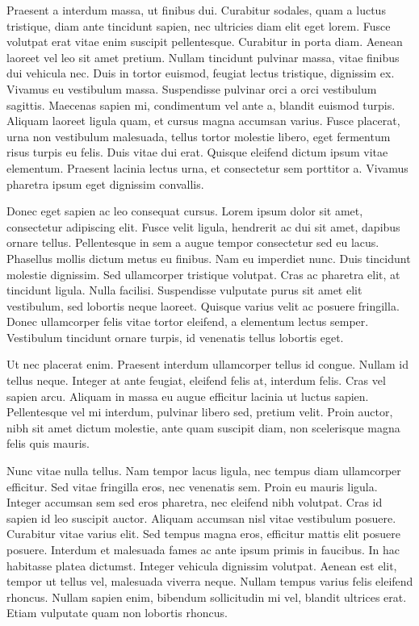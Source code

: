 \documentclass[a4paper,10pt]{article}
\theoremstyle{teorema}
\theoremstyle{plano}
\theoremstyle{titulo}
\begin{document}
Praesent a interdum massa, ut finibus dui. Curabitur sodales, quam a luctus tristique, diam ante tincidunt sapien, nec ultricies diam elit eget lorem. Fusce volutpat erat vitae enim suscipit pellentesque. Curabitur in porta diam. Aenean laoreet vel leo sit amet pretium. Nullam tincidunt pulvinar massa, vitae finibus dui vehicula nec. Duis in tortor euismod, feugiat lectus tristique, dignissim ex. Vivamus eu vestibulum massa. Suspendisse pulvinar orci a orci vestibulum sagittis. Maecenas sapien mi, condimentum vel ante a, blandit euismod turpis. Aliquam laoreet ligula quam, et cursus magna accumsan varius. Fusce placerat, urna non vestibulum malesuada, tellus tortor molestie libero, eget fermentum risus turpis eu felis. Duis vitae dui erat. Quisque eleifend dictum ipsum vitae elementum. Praesent lacinia lectus urna, et consectetur sem porttitor a. Vivamus pharetra ipsum eget dignissim convallis.

Donec eget sapien ac leo consequat cursus. Lorem ipsum dolor sit amet, consectetur adipiscing elit. Fusce velit ligula, hendrerit ac dui sit amet, dapibus ornare tellus. Pellentesque in sem a augue tempor consectetur sed eu lacus. Phasellus mollis dictum metus eu finibus. Nam eu imperdiet nunc. Duis tincidunt molestie dignissim. Sed ullamcorper tristique volutpat. Cras ac pharetra elit, at tincidunt ligula. Nulla facilisi. Suspendisse vulputate purus sit amet elit vestibulum, sed lobortis neque laoreet. Quisque varius velit ac posuere fringilla. Donec ullamcorper felis vitae tortor eleifend, a elementum lectus semper. Vestibulum tincidunt ornare turpis, id venenatis tellus lobortis eget.

Ut nec placerat enim. Praesent interdum ullamcorper tellus id congue. Nullam id tellus neque. Integer at ante feugiat, eleifend felis at, interdum felis. Cras vel sapien arcu. Aliquam in massa eu augue efficitur lacinia ut luctus sapien. Pellentesque vel mi interdum, pulvinar libero sed, pretium velit. Proin auctor, nibh sit amet dictum molestie, ante quam suscipit diam, non scelerisque magna felis quis mauris.

Nunc vitae nulla tellus. Nam tempor lacus ligula, nec tempus diam ullamcorper efficitur. Sed vitae fringilla eros, nec venenatis sem. Proin eu mauris ligula. Integer accumsan sem sed eros pharetra, nec eleifend nibh volutpat. Cras id sapien id leo suscipit auctor. Aliquam accumsan nisl vitae vestibulum posuere. Curabitur vitae varius elit. Sed tempus magna eros, efficitur mattis elit posuere posuere. Interdum et malesuada fames ac ante ipsum primis in faucibus. In hac habitasse platea dictumst. Integer vehicula dignissim volutpat. Aenean est elit, tempor ut tellus vel, malesuada viverra neque. Nullam tempus varius felis eleifend rhoncus. Nullam sapien enim, bibendum sollicitudin mi vel, blandit ultrices erat. Etiam vulputate quam non lobortis rhoncus.
\end{document}
